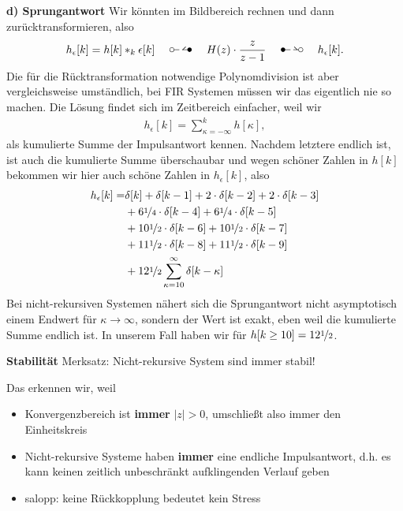 \begin{ExCalc}
\textbf{d) Sprungantwort}
Wir könnten im Bildbereich rechnen und dann zurücktransformieren, also
\begin{align}
h_\epsilon[k] = h[k]\ast_k \epsilon[k] \quad\ztransf\quad
H(z) \cdot \frac{z}{z-1} \quad\Ztransf\quad h_\epsilon[k].
\end{align}
Die für die Rücktransformation notwendige Polynomdivision ist aber
vergleichsweise umständlich, bei FIR Systemen müssen wir das eigentlich nie so
machen.
%
Die Lösung findet sich im Zeitbereich einfacher, weil wir
\begin{align}
h_\epsilon[k] = \sum_{\kappa=-\infty}^{k} h[\kappa],
\end{align}
als kumulierte Summe der Impulsantwort kennen. Nachdem letztere endlich ist,
ist auch die kumulierte Summe überschaubar und wegen schöner Zahlen in $h[k]$
bekommen wir hier auch schöne Zahlen in $h_\epsilon[k]$, also
\begin{align}
h_\epsilon[k] =
&\delta[k]
+\delta[k-1]
+2\cdot\delta[k-2]
+2\cdot\delta[k-3]\nonumber\\
&+6\nicefrac{1}{4}\cdot\delta[k-4]
+6\nicefrac{1}{4}\cdot\delta[k-5]\nonumber\\
&+10\nicefrac{1}{2}\cdot\delta[k-6]
+10\nicefrac{1}{2}\cdot\delta[k-7]\nonumber\\
&+11\nicefrac{1}{2}\cdot\delta[k-8]
+11\nicefrac{1}{2}\cdot\delta[k-9]\nonumber\\
&+12\nicefrac{1}{2}\sum_{\kappa=10}^{\infty}\delta[k-\kappa]
\end{align}
Bei nicht-rekursiven Systemen nähert sich die Sprungantwort nicht
asymptotisch einem Endwert für $\kappa\to\infty$, sondern der Wert ist exakt,
eben weil die kumulierte Summe endlich ist. In unserem Fall haben wir für
$h[k\geq 10] = 12\nicefrac{1}{2}$.

\textbf{Stabilität}
Merksatz: Nicht-rekursive System sind immer stabil!

Das erkennen wir, weil
\begin{itemize}
  \item Konvergenzbereich ist \textbf{immer} $|z|>0$, umschließt also immer den Einheitskreis
  \item Nicht-rekursive Systeme haben \textbf{immer} eine endliche Impulsantwort, d.h. es kann keinen zeitlich unbeschränkt aufklingenden Verlauf geben
  \item salopp: keine Rückkopplung bedeutet kein Stress
\end{itemize}



\end{ExCalc}
\begin{Loesung}
\end{Loesung}

